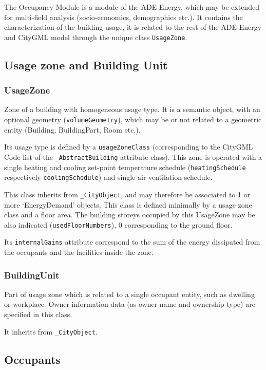 \documentclass[a4paper,12pt]{article}
\begin{document}
The Occupancy Module is a module of the ADE Energy, which may be
extended for multi-field analysis (socio-economics, demographics etc.).
It contains the characterization of the building usage, it is related to
the rest of the ADE Energy and CityGML model through the unique class
\texttt{UsageZone}.

\subsection{Usage zone and Building
Unit}\label{usage-zone-and-building-unit}

\subsubsection{UsageZone}\label{usagezone}

Zone of a building with homogeneous usage type. It is a semantic object,
with an optional geometry (\texttt{volumeGeometry}), which may be or not
related to a geometric entity (Building, BuildingPart, Room etc.).

Its usage type is defined by a \texttt{usageZoneClass} (corresponding to
the CityGML Code list of the \texttt{\_AbstractBuilding} attribute
class). This zone is operated with a single heating and cooling
set-point temperature schedule (\texttt{heatingSchedule} respectively
\texttt{coolingSchedule}) and single air ventilation schedule.

This class inherits from \texttt{\_CityObject}, and may therefore be
associated to 1 or more `EnergyDemand' objects. This class is defined
minimally by a usage zone class and a floor area. The building storeys
occupied by this UsageZone may be also indicated
(\texttt{usedFloorNumbers}), 0 corresponding to the ground floor.

Its \texttt{internalGains} attribute correspond to the sum of the energy
dissipated from the occupants and the facilities inside the zone.

\subsubsection{BuildingUnit}\label{buildingunit}

Part of usage zone which is related to a single occupant entity, such as
dwelling or workplace. Owner information data (as owner name and
ownership type) are specified in this class.

It inherits from \texttt{\_CityObject}.

\subsection{Occupants}\label{occupants}
\end{document}
